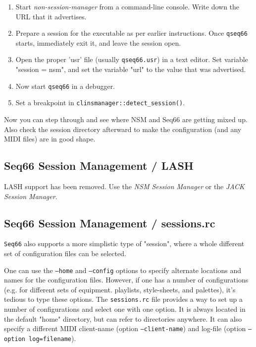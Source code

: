    \begin{enumerate}
      \item Start \textsl{non-session-manager} from a command-line console.
         Write down the URL that it advertises.
      \item Prepare a session for the executable as per earlier instructions.
         Once \texttt{qseq66} starts, immediately exit it, and leave the session
         open.
      \item Open the proper 'usr' file (usually \texttt{qseq66.usr}) in a 
         text editor.  Set variable "session = nsm", and set the variable "url"
         to the value that was advertised.
      \item Now start \texttt{qseq66} in a debugger.
      \item Set a breakpoint in \texttt{clinsmanager::detect\_session()}.
   \end{enumerate}
   
   Now you can step through and see where NSM and Seq66 are getting mixed up.
   Also check the session directory afterward to make the configuration
   (and any MIDI files) are in good shape.

\subsection{Seq66 Session Management / LASH}
\label{subsec:sessions_lash}

   LASH support has been removed.  Use the \textsl{NSM Session Manager} or
   the \textsl{JACK Session Manager}.

\subsection{Seq66 Session Management / sessions.rc}
\label{subsec:sessions_sessions_rc}

   \texttt{Seq66} also supports a more simplistic type of "session",
   where a whole different set of configuration files can be selected.

   One can use the \texttt{--home} and \texttt{--config} options
   to specify alternate locations and names for the configuration files.
   However, if one has a number of configurations
   (e.g. for different sets of equipment. playlists,
   style-sheets, and palettes),
   it's tedious to type these options.
   The \texttt{sessions.rc} file provides a way to set up a
   number of configurations and select one with one option.
   It is always located in the default
   "home" directory, but can refer to directories anywhere. It can also
   specify a different MIDI client-name
   (option \texttt{--client-name})
   and log-file
   (option \texttt{--option log=filename}).

